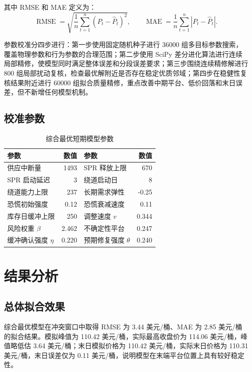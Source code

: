 \documentclass[UTF8,zihao=-4,fontset=fandol]{ctexart}
\begin{document}
其中 RMSE 和 MAE 定义为：
\begin{equation}
\operatorname{RMSE}
  =
  \sqrt{
  \frac{1}{n}
  \sum_{t=1}^{n}
  (P_t-\hat{P}_t)^2
  },
\qquad
\operatorname{MAE}
  =
  \frac{1}{n}
  \sum_{t=1}^{n}
  |P_t-\hat{P}_t|.
\end{equation}

参数校准分四步进行：第一步使用固定随机种子进行 36000 组多目标参数搜索，覆盖物理参数和行为参数的合理范围；第二步使用 SciPy 差分进化算法进行连续局部精修，使模型同时满足整体误差和分段误差要求；第三步围绕连续精修解进行 800 组局部扰动复核，检查最优解附近是否存在稳定优质邻域；第四步在稳健性复核结果附近进行 60000 组拟合质量精修，重点改善中期平台、低价回落和末日误差，但不新增任何模型机制。

\subsection{校准参数}

\begin{table}[H]
\centering
\caption{综合最优短期模型参数}
\begin{tabular}{lr@{\quad}lr}
\toprule
参数 & 数值 & 参数 & 数值 \\
\midrule
供应中断量 & 1493 & SPR 释放上限 & 670 \\
SPR 启动延迟 & 3 & 绕道启动日 & 8 \\
绕道能力上限 & 237 & 长期需求弹性 & -0.25 \\
恐慌初始强度 & 0.12 & 恐慌衰减速度 & 0.11 \\
库存日缓冲上限 & 250 & 调整速度 \(v\) & 0.344 \\
风险权重 \(\beta\) & 2.462 & 不确定性平台 & 0.247 \\
缓冲确认强度 \(\eta\) & 0.220 & 预期修复强度 \(\theta\) & 0.240 \\
\bottomrule
\end{tabular}
\end{table}

\section{结果分析}

\subsection{总体拟合效果}

综合最优模型在冲突窗口中取得 RMSE 为 3.44 美元/桶、MAE 为 2.85 美元/桶的拟合结果。模拟峰值为 110.42 美元/桶，实际最高收盘价为 114.06 美元/桶，峰值略低估 3.64 美元/桶；末日模拟价格为 110.42 美元/桶，实际末日价格为 110.31 美元/桶，末日误差仅为 0.11 美元/桶，说明模型在末端平台位置上具有较好稳定性。
\end{document}
